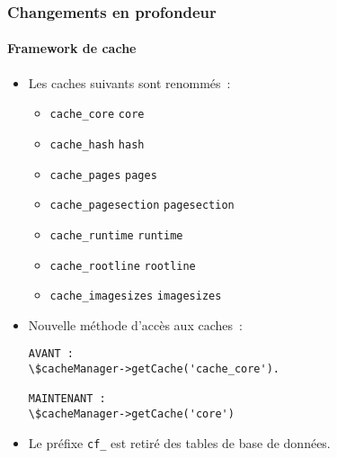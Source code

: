 \begin{frame}[fragile]
	\frametitle{Changements en profondeur}
	\framesubtitle{Framework de cache}

	\lstset{basicstyle=\tiny\ttfamily}

	\begin{itemize}
		\item Les caches suivants sont renommés~:

			\begin{itemize}\smaller
				\item \texttt{cache\_core} \textrightarrow\hspace{0.1cm}\texttt{core}
				\item \texttt{cache\_hash} \textrightarrow\hspace{0.1cm}\texttt{hash}
				\item \texttt{cache\_pages} \textrightarrow\hspace{0.1cm}\texttt{pages}
				\item \texttt{cache\_pagesection} \textrightarrow\hspace{0.1cm}\texttt{pagesection}
				\item \texttt{cache\_runtime} \textrightarrow\hspace{0.1cm}\texttt{runtime}
				\item \texttt{cache\_rootline} \textrightarrow\hspace{0.1cm}\texttt{rootline}
				\item \texttt{cache\_imagesizes} \textrightarrow\hspace{0.1cm}\texttt{imagesizes}
			\end{itemize}\normalsize

		\item Nouvelle méthode d'accès aux caches~:

\begin{lstlisting}
AVANT :
\$cacheManager->getCache('cache_core').

MAINTENANT :
\$cacheManager->getCache('core')
\end{lstlisting}

		\item Le préfixe \texttt{cf\_} est retiré des tables de base de données.
	\end{itemize}

\end{frame}


